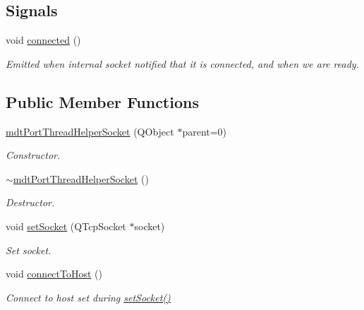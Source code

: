\subsection*{Signals}
\begin{DoxyCompactItemize}
\item 
\hypertarget{classmdt_port_thread_helper_socket_abd11bd8f13c7180389e8bf2249c643bf}{
void \hyperlink{classmdt_port_thread_helper_socket_abd11bd8f13c7180389e8bf2249c643bf}{connected} ()}
\label{classmdt_port_thread_helper_socket_abd11bd8f13c7180389e8bf2249c643bf}

\begin{DoxyCompactList}\small\item\em Emitted when internal socket notified that it is connected, and when we are ready. \end{DoxyCompactList}\end{DoxyCompactItemize}
\subsection*{Public Member Functions}
\begin{DoxyCompactItemize}
\item 
\hyperlink{classmdt_port_thread_helper_socket_aa77afb8d26e4863bd437e0d59efae7a7}{mdtPortThreadHelperSocket} (QObject $\ast$parent=0)
\begin{DoxyCompactList}\small\item\em Constructor. \end{DoxyCompactList}\item 
\hypertarget{classmdt_port_thread_helper_socket_a7fee8df32e619eb76bf365785a8b95b4}{
\hyperlink{classmdt_port_thread_helper_socket_a7fee8df32e619eb76bf365785a8b95b4}{$\sim$mdtPortThreadHelperSocket} ()}
\label{classmdt_port_thread_helper_socket_a7fee8df32e619eb76bf365785a8b95b4}

\begin{DoxyCompactList}\small\item\em Destructor. \end{DoxyCompactList}\item 
void \hyperlink{classmdt_port_thread_helper_socket_ab8d22e337e1cc2e043683da8b8a034e5}{setSocket} (QTcpSocket $\ast$socket)
\begin{DoxyCompactList}\small\item\em Set socket. \end{DoxyCompactList}\item 
void \hyperlink{classmdt_port_thread_helper_socket_a1948457ffe9027edfe3fcf5c01e8d7e1}{connectToHost} ()
\begin{DoxyCompactList}\small\item\em Connect to host set during \hyperlink{classmdt_port_thread_helper_socket_ab8d22e337e1cc2e043683da8b8a034e5}{setSocket()} \end{DoxyCompactList}\end{DoxyCompactItemize}


